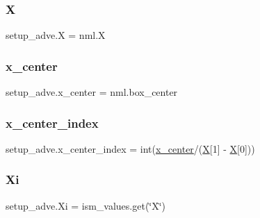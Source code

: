 \subsubsection{\texorpdfstring{X}{X}}
{\footnotesize\ttfamily setup\+\_\+adve.\+X = nml.\+X}

\mbox{\label{namespacesetup__adve_afa7c21c6336dc951736e8cc7f1510d4d}} 
\subsubsection{\texorpdfstring{x\+\_\+center}{x\_center}}
{\footnotesize\ttfamily setup\+\_\+adve.\+x\+\_\+center = nml.\+box\+\_\+center}

\mbox{\label{namespacesetup__adve_a1e6b2f1458d90ff7abdb915f94f94219}} 
\subsubsection{\texorpdfstring{x\+\_\+center\+\_\+index}{x\_center\_index}}
{\footnotesize\ttfamily setup\+\_\+adve.\+x\+\_\+center\+\_\+index = int(\hyperlink{namespacesetup__adve_afa7c21c6336dc951736e8cc7f1510d4d}{x\+\_\+center}/(\hyperlink{namespacesetup__adve_ac58005e2708a29ed334e0542dd68d336}{X}\mbox{[}1\mbox{]} -\/ \hyperlink{namespacesetup__adve_ac58005e2708a29ed334e0542dd68d336}{X}\mbox{[}0\mbox{]}))}

\mbox{\label{namespacesetup__adve_a112bae8cd7a1cb08a61dcdc1f3a17726}} 
\subsubsection{\texorpdfstring{Xi}{Xi}}
{\footnotesize\ttfamily setup\+\_\+adve.\+Xi = ism\+\_\+values.\+get(\char`\"{}X\char`\"{})}

